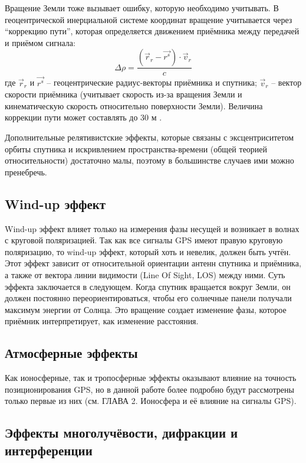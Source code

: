 Вращение Земли тоже вызывает ошибку, которую необходимо учитывать. 
В геоцентрической инерциальной системе координат вращение учитывается через ``коррекцию пути'', которая определяется движением приёмника между передачей и приёмом сигнала:
\begin{equation}
\Delta\rho=\frac{(\vec{r}_r-\vec{r^s})\cdot\vec{v}_r}{c}    
\end{equation}
где
$\vec{r}_r$ и $\vec{r^s}$ -- геоцентрические радиус-векторы приёмника и спутника;
$\vec{v}_r$ -- вектор скорости приёмника (учитывает скорость из-за вращения Земли и кинематическую скорость относительно поверхности Земли). 
Величина коррекции пути может составлять до 30 м \cite{Hecimovic2013}.  

Дополнительные релятивистские эффекты, которые связаны с эксцентриситетом орбиты спутника и искривлением пространства-времени (общей теорией относительности) достаточно малы, поэтому в большинстве случаев ими можно пренебречь. 

\subsection*{\textbf{Wind-up эффект}}

Wind-up эффект влияет только на измерения фазы несущей и возникает в волнах с круговой поляризацией.
Так как все сигналы GPS имеют правую круговую поляризацию, то wind-up эффект, который хоть и невелик, должен быть учтён. 
Этот эффект зависит от относительной ориентации антенн спутника и приёмника, а также от вектора линии видимости (Line Of Sight, LOS) между ними.
Суть эффекта заключается в следующем.
Когда спутник вращается вокруг Земли, он должен постоянно переориентироваться, чтобы его солнечные панели получали максимум энергии от Солнца.
Это вращение создает изменение фазы, которое приёмник интерпретирует, как изменение расстояния. 

\subsection*{\textbf{Атмосферные эффекты}}

Как ионосферные, так и тропосферные эффекты оказывают влияние на точность позиционирования GPS, но в данной работе более подробно будут рассмотрены только первые из них (см. ГЛАВА 2. Ионосфера и её влияние на сигналы GPS). 

\subsection*{\textbf{Эффекты многолучёвости, дифракции и интерференции}}

